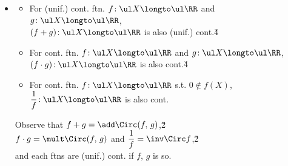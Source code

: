\documentclass[dvipdfmx,a4paper,titlepage,9pt]{jsarticle}
\begin{document}
\begin{multicols*}{2}
\begin{itemize}[label=-]
\begin{pfbox}
\dotfill

\begin{proof}[{\color{TGreen}Seq. Ftn. ($\Longto$\!)}]\rnc{\qedsymbol}{\Sq}
For each $i\in[1,\,n]\cap\NN$,\\
$p_i\Circ (f_1,\,f_2,\,\ldots,\,f_n)=f_i$ is (unif.) cont.
\end{proof}\v{-3}

\dotfill

\begin{proof}[{\color{TGreen}Seq. Ftn. ($\Longfrom$)}]
Given $\epsilon>0$, for each $i\in[1,\,n]\cap\NN$, $\exists\delta_i>0$ s.t.\v{-4}
$$d(x,\,y)<\delta\quad\tx{implies}\quad |f_i(x)-f_i(y)|<\epsilon/\sqrt n\tx.\v{-4}$$
If we set $\delta=\min{}\{\delta_i:i=1\tx,\,2\tx,\,\ldots\tx,\,n\}$, then
$d(x,\,y)<\delta$ implies\v{-4}
$$\begin{aligned}
&d_E((f_1,\,f_2,\,\ldots,\,f_n)(x)-(f_1,\,f_2,\,\ldots,\,f_n)(y))\\
={}&\sqrt{\sum_{k=1}^n(f_k(x)-f_k(y))^2}<\sqrt{n\cdot\left(\frac\epsilon{\sqrt n}\right)^{\!2}}=\epsilon\tx,
\end{aligned}\v{-4}$$
thus $(f_1,\,f_2,\,\ldots,\,f_n)$ is unif. cont.
\end{proof}
\end{pfbox}\,

\item{}
\begin{itemize}[label=\Cdot]
\setlength{\leftskip}{-10pt}
\item For (unif.) cont. ftn. $f\!: \ul X\longto\ul\RR$ and $g\!:\ul X\longto\ul\RR$,\\
$(f+g)\!: \ul X\longto\ul\RR$ is also (unif.) cont.\v4

\item For cont. ftn. $f\!:\ul X\longto\ul\RR$ and $g\!:\ul X\longto\ul\RR$,\\
$(f\cdot g)\!:\ul X\longto\ul\RR$ is also cont.\v4

\item For cont. ftn. $f\!:\ul X\longto\ul\RR$ s.t. $0\notin f(X)$,\\
$\dfrac1f\!:\ul X\longto\ul\RR$ is also cont.
\end{itemize}

\begin{Pfbox}
Observe that $f+g=\add\Circ(f,\,g)$,\v2\\
$f\cdot g=\mult\Circ(f,\,g)$ and $\dfrac1f=\inv\Circ f$,\v2\\
and each ftns are (unif.) cont. if $f$, $g$ is so.
\end{Pfbox}
\end{itemize}
\newpage


\end{multicols*}
\end{document}
